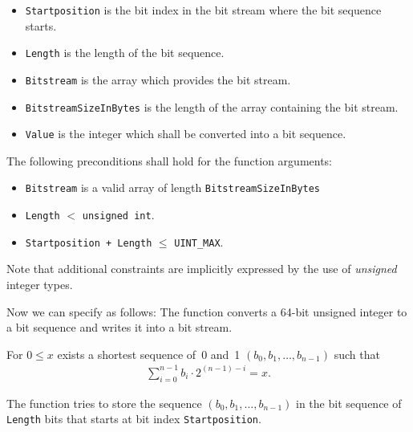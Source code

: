 \begin{itemize}
    \item \texttt{Startposition} is the bit index in the bit stream 
    where the bit sequence starts.
    \item \texttt{Length} is the length of the bit sequence.
    \item \texttt{Bitstream} is the array which provides the bit stream.
    \item \texttt{BitstreamSizeInBytes} is the length of the array 
    containing the bit stream. 
    \item \texttt{Value} is the integer which shall be converted into a bit sequence.
\end{itemize}


The following preconditions shall hold for the function arguments:

\begin{itemize}
\item \texttt{Bitstream} is a valid array of length \verb"BitstreamSizeInBytes"

\item \texttt{Length} $<$ \texttt{unsigned int}.

\item \texttt{Startposition + Length} $\leq$ \verb"UINT_MAX".
\end{itemize}

Note that additional constraints are implicitly expressed by the use
of \emph{unsigned} integer types.


Now we can specify \poke as follows:
The function \poke converts a 64-bit unsigned integer to a bit sequence and 
writes it into a bit stream.

For $0 \leq x$ exists a shortest sequence of~0 and~1
$(b_0, b_1,\ldots,b_{n - 1})$
such that
\begin{align}
    \sum_{i=0}^{n-1} b_i \cdot 2^{(n - 1) - i} = x.
\end{align}

The function \poke tries to store the sequence $(b_0, b_1,\ldots,b_{n - 1})$
in the bit sequence of \texttt{Length} bits that starts
at bit index \texttt{Startposition}.

